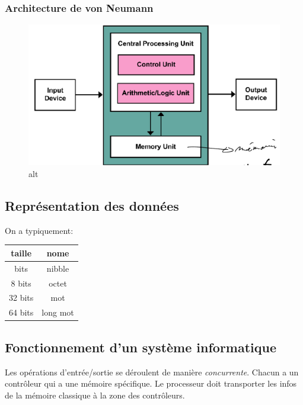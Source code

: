\subsubsection{Architecture de von
Neumann}\label{architecture-de-von-neumann}

\begin{figure}
\centering
\includegraphics{image-5.png}
\caption{alt}
\end{figure}

\subsection{Représentation des
données}\label{repruxe9sentation-des-donnuxe9es}

On a typiquement:

\begin{longtable}[]{@{}cc@{}}
\toprule\noalign{}
taille & nome \\
\midrule\noalign{}
\endhead
\bottomrule\noalign{}
\endlastfoot
4 bits & nibble \\
8 bits & octet \\
32 bits & mot \\
64 bits & long mot \\
\end{longtable}

\subsection{Fonctionnement d'un système
informatique}\label{fonctionnement-dun-systuxe8me-informatique}

Les opérations d'entrée/sortie se déroulent de manière
\emph{concurrente}. Chacun a un contrôleur qui a une mémoire spécifique.
Le processeur doit transporter les infos de la mémoire classique à la
zone des contrôleurs.

